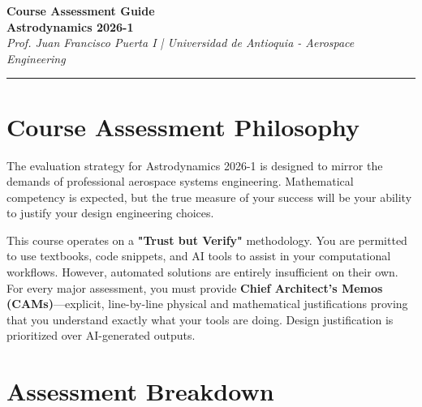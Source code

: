 \documentclass[11pt, letterpaper]{article}
\begin{document}
\begin{center}
    {\Huge \textbf{Course Assessment Guide}} \\
    \vspace{0.3cm}
    {\Large \textbf{Astrodynamics 2026-1}} \\
    \vspace{0.4cm}
    \textit{Prof. Juan Francisco Puerta I | Universidad de Antioquia - Aerospace Engineering}
\end{center}

\hrule
\vspace{0.5cm}

\section*{Course Assessment Philosophy}
The evaluation strategy for Astrodynamics 2026-1 is designed to mirror the demands of professional aerospace systems engineering. Mathematical competency is expected, but the true measure of your success will be your ability to justify your design engineering choices. 

This course operates on a \textbf{"Trust but Verify"} methodology. You are permitted to use textbooks, code snippets, and AI tools to assist in your computational workflows. However, automated solutions are entirely insufficient on their own. For every major assessment, you must provide \textbf{Chief Architect's Memos (CAMs)}—explicit, line-by-line physical and mathematical justifications proving that you understand exactly what your tools are doing. Design justification is prioritized over AI-generated outputs.

\section*{Assessment Breakdown}
\end{document}
